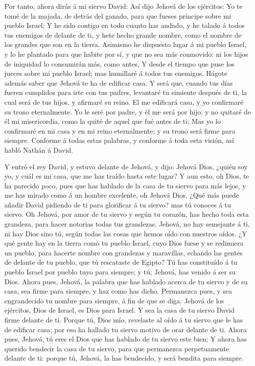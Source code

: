  Por tanto, ahora dirás á mi siervo David: Así dijo Jehová
de los ejércitos: Yo te tomé de la majada, de detrás del ganado, para
que fueses príncipe sobre mi pueblo Israel;  Y he sido
contigo en todo cuanto has andado, y he talado á todos tus enemigos de
delante de ti, y hete hecho grande nombre, como el nombre de los grandes
que son en la tierra.  Asimismo he dispuesto lugar á mi
pueblo Israel, y lo he plantado para que habite por sí, y que no sea más
conmovido: ni los hijos de iniquidad lo consumirán más, como antes,
 Y desde el tiempo que puse los jueces sobre mi pueblo
Israel; mas humillaré á todos tus enemigos. Hágote además saber que
Jehová te ha de edificar casa.  Y será que, cuando tus días
fueren cumplidos para irte con tus padres, levantaré tu simiente después
de ti, la cual será de tus hijos, y afirmaré su reino.  El
me edificará casa, y yo confirmaré su trono eternalmente. 
Yo le seré por padre, y él me será por hijo: y no quitaré de él mi
misericordia, como la quité de aquel que fué antes de ti; 
Mas yo lo confirmaré en mi casa y en mi reino eternalmente; y su trono
será firme para siempre.  Conforme á todas estas palabras,
y conforme á toda esta visión, así habló Nathán á David.

 Y entró el rey David, y estuvo delante de Jehová, y dijo:
Jehová Dios, ¿quién soy yo, y cuál es mi casa, que me has traído hasta
este lugar?  Y aun esto, oh Dios, te ha parecido poco, pues
que has hablado de la casa de tu siervo para más lejos, y me has mirado
como á un hombre excelente, oh Jehová Dios.  ¿Qué más puede
añadir David pidiendo de ti para glorificar á tu siervo? mas tú conoces
á tu siervo.  Oh Jehová, por amor de tu siervo y según tu
corazón, has hecho toda esta grandeza, para hacer notorias todas tus
grandezas.  Jehová, no hay semejante á ti, ni hay Dios sino
tú, según todas las cosas que hemos oído con nuestros oídos.
 ¿Y qué gente hay en la tierra como tu pueblo Israel, cuyo
Dios fuese y se redimiera un pueblo, para hacerte nombre con grandezas y
maravillas, echando las gentes de delante de tu pueblo, que tú
rescataste de Egipto?  Tú has constituído á tu pueblo
Israel por pueblo tuyo para siempre; y tú, Jehová, has venido á ser su
Dios.  Ahora pues, Jehová, la palabra que has hablado
acerca de tu siervo y de su casa, sea firme para siempre, y haz como has
dicho.  Permanezca pues, y sea engrandecido tu nombre para
siempre, á fin de que se diga: Jehová de los ejércitos, Dios de Israel,
es Dios para Israel. Y sea la casa de tu siervo David firme delante de
ti.  Porque tú, Dios mío, revelaste al oído á tu siervo que
le has de edificar casa; por eso ha hallado tu siervo motivo de orar
delante de ti.  Ahora pues, Jehová, tú eres el Dios que has
hablado de tu siervo este bien;  Y ahora has querido
bendecir la casa de tu siervo, para que permanezca perpetuamente delante
de ti: porque tú, Jehová, la has bendecido, y será bendita para siempre.

